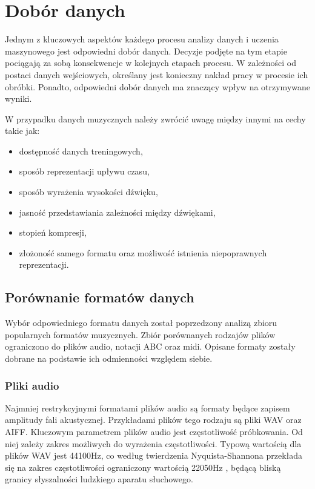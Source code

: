 \chapter {Dobór danych} 
{
    Jednym z\,\,kluczowych aspektów każdego procesu analizy danych i\,\,uczenia maszynowego
    jest odpowiedni dobór danych. Decyzje podjęte na tym etapie pociągają za sobą 
    konsekwencje w\,\,kolejnych etapach procesu. W\,\,zależności od postaci danych wejściowych,
    określany jest konieczny nakład pracy w\,\,procesie ich obróbki. 
    Ponadto, odpowiedni dobór danych ma znaczący wpływ na otrzymywane wyniki.

    W\,\,przypadku danych muzycznych należy zwrócić uwagę między innymi na cechy takie jak:
    \begin{itemize}
        \setlength\itemsep{-0.5em}
        \item dostępność danych treningowych,
        \item sposób reprezentacji upływu czasu,
        \item sposób wyrażenia wysokości dźwięku,
        \item jasność przedstawiania zależności między dźwiękami,
        \item stopień kompresji,
        \item złożoność samego formatu oraz możliwość istnienia niepoprawnych reprezentacji.
    \end{itemize}

    \section{Porównanie formatów danych}
    {
        Wybór odpowiedniego formatu danych został poprzedzony analizą zbioru popularnych formatów muzycznych.
        Zbiór porównanych rodzajów plików ograniczono do plików audio, notacji ABC oraz midi.
        Opisane formaty zostały dobrane na podstawie ich odmienności względem siebie.

        \subsection{Pliki audio}
        {
            Najmniej restrykcyjnymi formatami plików audio są formaty będące zapisem
            amplitudy fali akustycznej. Przykładami plików tego rodzaju są pliki WAV
            oraz AIFF.
            Kluczowym parametrem plików audio jest częstotliwość próbkowania. Od niej
            zależy zakres możliwych do wyrażenia częstotliwości. Typową wartością dla plików
            WAV jest 44100Hz, co według twierdzenia Nyquista-Shannona przekłada się na zakres
            częstotliwości ograniczony wartością 22050Hz \cite{Shannon1949CommunicationIT}, będącą bliską granicy słyszalności
            ludzkiego aparatu słuchowego. 

}}}

